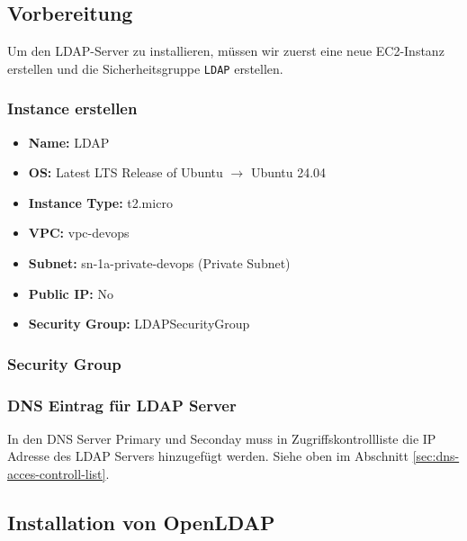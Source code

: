 \documentclass[a4paper,12pt]{article}
\begin{document}
\subsection{Vorbereitung}
Um den LDAP-Server zu installieren, müssen wir zuerst eine neue EC2-Instanz erstellen und die Sicherheitsgruppe \texttt{LDAP} erstellen.
\newpage
\subsubsection{Instance erstellen}

\begin{itemize}
    \item \textbf{Name:} LDAP
    \item \textbf{OS:} Latest LTS Release of Ubuntu $\rightarrow$ Ubuntu 24.04
    \item \textbf{Instance Type:} t2.micro
    \item \textbf{VPC:} vpc-devops
    \item \textbf{Subnet:} sn-1a-private-devops (Private Subnet)
    \item \textbf{Public IP:} No
    \item \textbf{Security Group:} LDAPSecurityGroup
\end{itemize}

\subsubsection{Security Group}
\begin{table}[h!]
	\centering
	\caption{Security Group: LDAP}
	\label{tab:sec-Group-GitLab-Public}
\end{table}


\subsubsection{DNS Eintrag für LDAP Server}
In den DNS Server Primary und Seconday muss in Zugriffskontrollliste die IP Adresse des LDAP Servers hinzugefügt werden. Siehe oben im Abschnitt \ref{sec:dns-acces-controll-list}. 

\subsection{Installation von OpenLDAP}



\newpage
{}
\listoffigures
\newpage
{}
\listoftables
\end{document}

